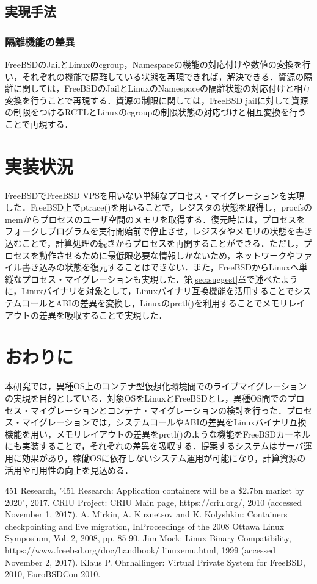 \documentclass[11pt]{jarticle}
\begin{document}
\subsection{実現手法}
\subsubsection{隔離機能の差異}
FreeBSDのJailとLinuxのcgroup，Namespaceの機能の対応付けや数値の変換を行い，それぞれの機能で隔離している状態を再現できれば，解決できる．資源の隔離に関しては，FreeBSDのJailとLinuxのNamespaceの隔離状態の対応付けと相互変換を行うことで再現する．資源の制限に関しては，FreeBSD jailに対して資源の制限をつけるRCTLとLinuxのcgroupの制限状態の対応づけと相互変換を行うことで再現する．

\section{実装状況}
FreeBSDでFreeBSD VPSを用いない単純なプロセス・マイグレーションを実現した．FreeBSD上でptrace()を用いることで，レジスタの状態を取得し，procfsのmemからプロセスのユーザ空間のメモリを取得する．復元時には，プロセスをフォークしプログラムを実行開始前で停止させ，レジスタやメモリの状態を書き込むことで，計算処理の続きからプロセスを再開することができる．ただし，プロセスを動作させるために最低限必要な情報しかないため，ネットワークやファイル書き込みの状態を復元することはできない．また，FreeBSDからLinuxへ単縦なプロセス・マイグレーションも実現した．第\ref{sec:suggest}章で述べたように，Linuxバイナリを対象として，Linuxバイナリ互換機能を活用することでシステムコールとABIの差異を変換し，Linuxのprctl()を利用することでメモリレイアウトの差異を吸収することで実現した．

\section{おわりに}
本研究では，異種OS上のコンテナ型仮想化環境間でのライブマイグレーションの実現を目的としている．対象OSをLinuxとFreeBSDとし，異種OS間でのプロセス・マイグレーションとコンテナ・マイグレーションの検討を行った．プロセス・マイグレーションでは，システムコールやABIの差異をLinuxバイナリ互換機能を用い，メモリレイアウトの差異をprctl()のような機能をFreeBSDカーネルにも実装することで，それぞれの差異を吸収する．提案するシステムはサーバ運用に効果があり，稼働OSに依存しないシステム運用が可能になり，計算資源の活用や可用性の向上を見込める．



\begin{thebibliography}{99}
	451 Research, "451 Research: Application containers will be a \$2.7bn market by 2020", 2017.
	CRIU Project: CRIU Main page, https://criu.org/, 2010 (accessed November 1, 2017).
	A. Mirkin, A. Kuznetsov and K. Kolyshkin: Containers checkpointing and live migration, InProceedings of the 2008 Ottawa Linux Symposium, Vol. 2, 2008, pp. 85-90.
	Jim Mock: Linux Binary Compatibility, https://www.freebsd.org/doc/handbook/
  linuxemu.html, 1999 (accessed November 2, 2017).
  Klaus P. Ohrhallinger: Virtual Private System for FreeBSD, 2010, EuroBSDCon 2010.
\end{thebibliography}
\end{document}
